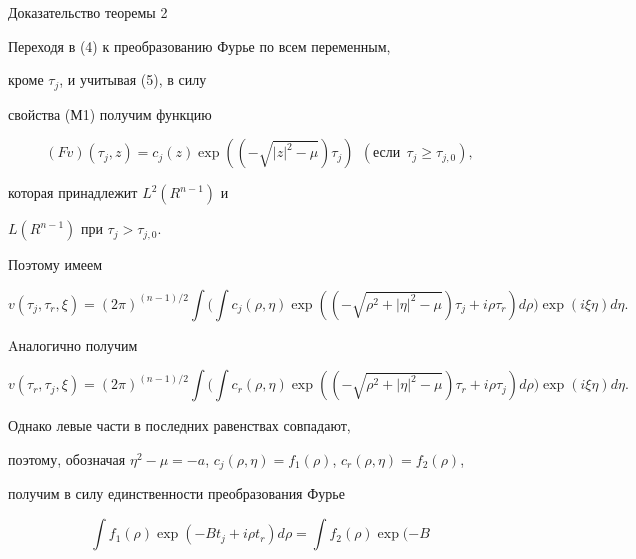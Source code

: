 \begin{pf*}{Доказательство теоремы 2} 


Переходя в (4) к преобразованию Фурье по всем переменным, 


кроме $\tau_{j} $, и учитывая (5), в силу


свойства (М1) получим функцию


$$


(F v) (\tau_{j}, z)= c_{j}(z) \exp ((-\sqrt{| z


| ^{2}- \mu })\tau_{j}) \ \ (\text{если} \ \ \tau_{j} \ge


\tau_{j, 0}),


$$


которая принадлежит $ L^{2} (R^{n-1}) $ и


$ L(R^{n-1})$ при $\tau_{j} > \tau_{j, 0}$.


Поэтому имеем


$$


v(\tau_{j}, \tau_{r}, \xi)= (2\pi)^{(n-1)/2} \int


\bigg( \int c_{j} (\rho, \eta) \exp ((-\sqrt{\rho ^{2}+


| \eta | ^{2} - \mu }) \tau_{j} +


i\rho \tau_{r})


d \rho \bigg) \exp (i \xi \eta ) d \eta .


$$


Aналогично получим


$$


v(\tau_{r}, \tau_{j}, \xi)= (2\pi)^{(n-1)/2} \int


\bigg( \int c_{r}(\rho, \eta) \exp ((-\sqrt{\rho ^{2}+


| \eta |^{2} - \mu}) \tau_{r} + 


i \rho \tau_{j})


d \rho \bigg) \exp (i \xi \eta ) d \eta .


$$


Однако левые части в последних равенствах совпадают, 


поэтому, обозначая $ \eta ^{2}-\mu =-a$, $c_{j} (\rho, 


\eta )=f_{1}(\rho )$, $c_{r}(\rho, \eta)=f_{2}(\rho)$,


получим в силу единственности преобразования Фурье


\begin{equation}


 \int f_{1}(\rho) \exp(-B t_{j} +i\rho


t_{r}) d \rho = \int f_{2}(\rho) \exp(-B



\end{equation}
\end{pf*}
